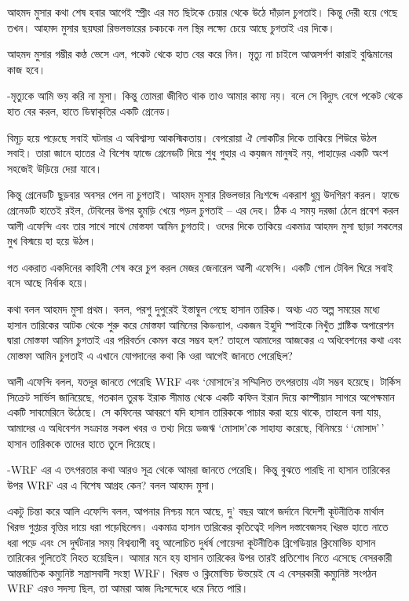 \documentclass[
]{book}
\begin{document}
আহমদ মুসার কথা শেষ হবার আগেই স্প্রীং এর মত ছিটকে চেয়ার থেকে উঠে দাঁড়াল চুগতাই। কিন্তু দেরী হয়ে গেছে তখন। আহমদ মুসার ছয়ঘরা রিভলভারের চকচকে নল স্থির লক্ষ্যে চেয়ে আছে চুগতাই এর দিকে।

আহমদ মুসার গম্ভীর কণ্ঠ ভেসে এল, পকেট থেকে হাত বের করে নিন। মৃত্যু না চাইলে আত্মসর্পণ কারাই বুদ্ধিমানের কাজ হবে।

-মৃত্যুকে আমি ভয় করি না মুসা। কিন্তু তোমরা জীবিত থাক তাও আমার কাম্য নয়। বলে সে বিদ্যুৎ বেগে পকেট থেকে হাত বের করল, হাতে ডিম্বাকৃতির একটি গ্রেনেড।

বিমূঢ় হয়ে পড়েছে সবাই ঘটনার এ অবিশ্বাস্য আকস্মিকতায়। বেপরোয়া ঐ লোকটির দিকে তাকিয়ে শিউরে উঠল সবাই। তারা জানে হাতের ঐ বিশেষ হ্যান্ডে গ্রেনেডটি দিয়ে শুধু গুহার এ কয়জন মানুষই নয়, পাহাড়ের একটি অংশ সহজেই উড়িয়ে দেয়া যাবে।

কিন্তু গ্রেনেডটি ছুড়বার অবসর পেল না চুগতাই। আহমদ মুসার রিভলভার নিঃশব্দে একরাশ ধুম্র উদগিরণ করল। হ্যান্ডে গ্রেনেডটি হাতেই রইল, টেবিলের উপর হুমড়ি খেয়ে পড়ল চুগতাই -- এর দেহ। ঠিক এ সময় দরজা ঠেলে প্রবেশ করল আলী এফেন্দি এবং তার সাথে সাথে মোস্তফা আমিন চুগতাই। ওদের দিকে তাকিয়ে একমাত্র আহমদ মুসা ছাড়া সকলের মুখ বিস্ময়ে হা হয়ে উঠল।

গত একরাত একদিনের কাহিনী শেষ করে চুপ করল মেজর জেনারেল আলী এফেন্দি। একটি গোল টেবিল ঘিরে সবাই বসে আছে নির্বাক হয়ে।

কথা বলল আহমদ মুসা প্রথম। বলল, পরশু দুপুরেই ইস্তাম্বুল গেছে হাসান তারিক। অথচ এত অল্প সময়ের মধ্যে হাসান তারিকের আটক থেকে শুরু করে মোস্তফা আমিনের কিডন্যাপ, একজন ইহুদি স্পাইকে নিখুঁত প্লাষ্টিক অপারেশন দ্বারা মোস্তফা আমিন চুগতাই এর পরিবর্তন কেমন করে সম্ভব হল? তাহলে আমাদের আজকের এ অধিবেশনের কথা এবং মোস্তফা আমিন চুগতাই এ এখানে যোগদানের কথা কি ওরা আগেই জানতে পেরেছিল?

আলী এফেন্দি বলল, যতদূর জানতে পেরেছি WRF এবং `মোসাদে'র সম্মিলিত তৎপরতায় এটা সম্ভব হয়েছে। টার্কিস সিক্রেট সার্ভিস জানিয়েছে, গতকাল তুরস্ক ইরাক সীমান্ত থেকে একটি কফিন ইরান দিয়ে কাস্পীয়ান সাগরে অপেক্ষমান একটি সাবমেরিনে উঠেছে। সে কফিনের আবরণে যদি হাসান তারিককে পাচার করা হয়ে থাকে, তাহলে বলা যায়, আমাদের এ অধিবেশন সংক্রান্ত সকল খবর ও তথ্য দিয়ে ডজঋ `মোসাদ'কে সাহায্য করেছে, বিনিময়ে `\,`মোসাদ'\,' হাসান তারিককে তাদের হাতে তুলে দিয়েছে।

-WRF এর এ তৎপরতার কথা আরও সূত্র থেকে আমরা জানতে পেরেছি। কিন্তু বুঝতে পারছি না হাসান তারিকের উপর WRF এর এ বিশেষ আগ্রহ কেন? বলল আহমদ মুসা।

একটু চিন্তা করে আলি এফেন্দি বলল, আপনার নিশ্চয় মনে আছে, দু' বছর আগে জর্দানে বিদেশী কূটনীতিক মার্থাল খিরভ গুপ্তচর বৃত্তির দায়ে ধরা পড়েছিলেন। একমাত্র হাসান তারিকের কৃতিত্বেই দলিল দস্তাবেজসহ খিরভ হাতে নাতে ধরা পড়ে এবং সে দুর্ঘটনার সময় বিশ্বব্যাপী বহু আলোচিত দুর্ধর্ষ গোয়েন্দা কূটনীতিক ব্রিগেডিয়ার ক্লিমোভিচ হাসান তারিকের গুলিতেই নিহত হয়েছিল। আমার মনে হয় হাসান তারিকের উপর তারই প্রতিশোধ নিতে এসেছে বেসরকারী আন্তর্জাতিক কম্যুনিষ্ট সন্ত্রাসবাদী সংস্থা WRF। খিরভ ও ক্লিমোভিচ উভয়েই যে এ বেসরকারী কম্যুনিষ্ট সংগঠন WRF এরও সদস্য ছিল, তা আমরা আজ নিঃসন্দেহে ধরে নিতে পারি।
\end{document}
